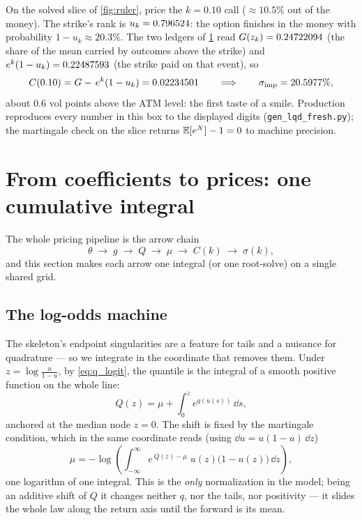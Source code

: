 \documentclass[11pt]{article}
\begin{document}
\begin{example}[title={A trade ticket priced by hand}]
On the solved slice of \cref{fig:ruler}, price the $k=0.10$ call
($\approx10.5\%$ out of the money).  The strike's rank is
$u_{k}=0.796524$: the option finishes in the money with probability
$1-u_k\approx20.3\%$.  The two ledgers of \cref{sec:pricing} read
$G(z_k)=0.24722094$ (the share of the mean carried by outcomes
above the strike) and $e^{k}(1-u_k)=0.22487593$ (the strike paid on
that event), so
\[
C(0.10)=G-\,e^{k}(1-u_k)=0.02234501
\qquad\Longrightarrow\qquad
\sigma_{\text{imp}}=20.5977\%,
\]
about $0.6$ vol points above the ATM level: the first taste of a smile.
Production reproduces every number in this box to the displayed digits
(\texttt{gen\_lqd\_fresh.py}); the martingale check on the slice returns
$\mathbb{E}[e^{X}]-1=0$ to machine precision.
\end{example}

\section{From coefficients to prices: one cumulative integral}
\label{sec:pricing}

The whole pricing pipeline is the arrow chain
\[
\theta\;\longrightarrow\;g\;\longrightarrow\;Q\;\longrightarrow\;\mu
\;\longrightarrow\;C(k)\;\longrightarrow\;\sigma(k),
\]
and this section makes each arrow one integral (or one root-solve) on a
single shared grid.

\subsection{The log-odds machine}

The skeleton's endpoint singularities are a feature for tails and a nuisance
for quadrature --- so we integrate in the coordinate that removes them.
Under $z=\log\frac{u}{1-u}$, by \eqref{eq:q_logit}, the quantile is the
integral of a smooth positive function on the whole line:
\begin{equation}
Q(z)=\mu+\int_0^{z}e^{g(u(s))}\,\dd s ,
\label{eq:Q_of_z}
\end{equation}
anchored at the median node $z=0$.  The shift is fixed by the martingale
condition, which in the same coordinate reads (using $\dd u = u(1-u)\,\dd z$)
\begin{equation}
\mu=-\log\!\left(
\int_{-\infty}^{\infty}
e^{\,Q(z)-\mu}\;u(z)\big(1-u(z)\big)\,\dd z\right),
\label{eq:mu_norm}
\end{equation}
one logarithm of one integral.  This is the \emph{only} normalization in the
model; being an additive shift of $Q$ it changes neither $q$, nor the tails,
nor positivity --- it slides the whole law along the return axis until the
forward is its mean.
\end{document}
